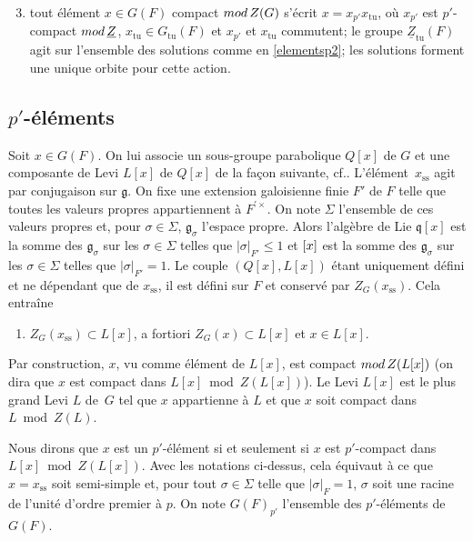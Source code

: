 \documentclass[11pt]{article}
\newcommand{\cf}{cf.\xspace}
\numberwithin{equation}{section}\providecommand{\og}{«\,}\providecommand{\fg}{\,»}
\newcommand{\NoChangel}[1]{%
\expandafter\let\csname old\string#1\endcsname=#1
\let#1=\relax
\newcommand{#1}{\mathcode`l="716C\csname old\string#1\endcsname\mathcode`l="7160 }%
}
\newcommand{\rmod}{\textup{mod}\,}
\newcommand{\frg}{\mathfrak{g}}
\newcommand{\frl}{\mathfrak{l}}\NoChangel{\frl}
\newcommand{\mfrq}{\mathfrak{q}}
\newcommand{\rss}{\mathrm{ss}}
\newcommand{\tu}{\mathrm{tu}}
\theoremstyle{plain}
\theoremstyle{definition}
\begin{document}
\begin{enumerate}\setcounter{enumi}{2}
\item\label{elementsp3}
tout élément $x\in G(F)$ compact $\rmod Z(G)$ s'écrit $x=x_{p'}x_{\tu}$, où $x_{p'}$ est $p'$\nobreakdash-compact $\rmod \underline{Z}$, $x_{\tu}\in G_{\tu}(F)$ et $x_{p'}$ et $x_{\tu}$ commutent; le groupe $\underline{Z}_{\tu}(F)$ agit sur l'ensemble des solutions comme en \eqref{elementsp2}; les solutions forment une unique orbite pour cette action.
\end{enumerate}

\subsection{\texorpdfstring{$p'$}{p'}-éléments}\label{pelements}

Soit $x\in G(F)$. On lui associe un sous-groupe parabolique $Q[x]$ de $G$ et une composante de Levi $L[x]$ de $Q[x]$ de la façon suivante, \cf \cite{C}. L'élément~$x_{\rss}$ agit par conjugaison sur $\frg$. On fixe une extension galoisienne finie $F'$ de $F$ telle que toutes les valeurs propres appartiennent à $F^{\prime\times}$. On note $\Sigma$ l'ensemble de ces valeurs propres et, pour $\sigma\in \Sigma$, $\frg_{\sigma}$ l'espace propre. Alors l'algèbre de Lie $\mfrq[x]$ est la somme des $\frg_{\sigma}$ sur les $\sigma\in \Sigma$ telles que $\vert \sigma\vert _{F'}\leq 1$ et $\frl[x]$ est la somme des $\frg_{\sigma}$ sur les $\sigma\in \Sigma$ telles que $\vert \sigma\vert _{F'}= 1$.
Le couple $(Q[x], L[x])$ étant uniquement défini et ne dépendant que de $x_{\rss}$, il est défini sur $F$ et conservé par $Z_{G}(x_{\rss})$. Cela entraîne
\begin{enumerate}
\item\label{pelements1}
$Z_{G}(x_{\rss})\subset L[x]$, a fortiori $Z_{G}(x)\subset L[x]$ et $x\in L[x]$.
\end{enumerate}

Par construction, $x$, vu comme élément de $L[x]$, est compact $\rmod Z(L[x])$ (on dira que $x$ est compact dans $L[x]\bmod Z(L[x])$). Le Levi $L[x]$ est le plus grand Levi $L$ de~$G$ tel que $x$ appartienne à $L$ et que $x$ soit compact dans $L\bmod Z(L)$.

Nous dirons que $x$ est un $p'$-élément si et seulement si $x$ est $p'$-compact dans $L[x]\bmod Z(L[x])$. Avec les notations ci-dessus, cela équivaut à ce que $x=x_{\rss}$ soit semi-simple et, pour tout $\sigma\in \Sigma$ telle que $\vert \sigma\vert _{F}=1$, $\sigma$ soit une racine de l'unité d'ordre premier à $p$. On note $G(F)_{p'}$ l'ensemble des $p'$-éléments de $G(F)$.
\end{document}
